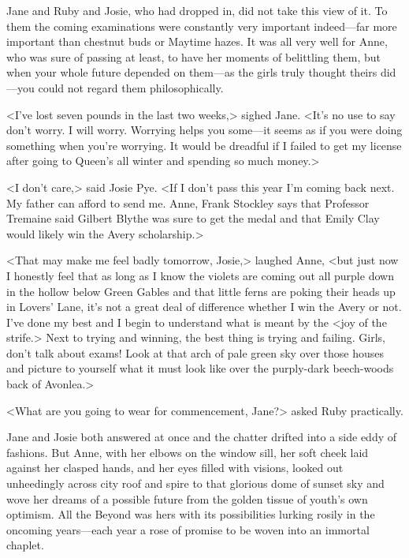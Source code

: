 Jane and Ruby and Josie, who had dropped in, did not take this view of it. To them the coming examinations were constantly very important indeed—far more important than chestnut buds or Maytime hazes. It was all very well for Anne, who was sure of passing at least, to have her moments of belittling them, but when your whole future depended on them—as the girls truly thought theirs did—you could not regard them philosophically.

<I've lost seven pounds in the last two weeks,> sighed Jane. <It's no use to say don't worry. I will worry. Worrying helps you some—it seems as if you were doing something when you're worrying. It would be dreadful if I failed to get my license after going to Queen's all winter and spending so much money.>

<I don't care,> said Josie Pye. <If I don't pass this year I'm coming back next. My father can afford to send me. Anne, Frank Stockley says that Professor Tremaine said Gilbert Blythe was sure to get the medal and that Emily Clay would likely win the Avery scholarship.>

<That may make me feel badly tomorrow, Josie,> laughed Anne, <but just now I honestly feel that as long as I know the violets are coming out all purple down in the hollow below Green Gables and that little ferns are poking their heads up in Lovers' Lane, it's not a great deal of difference whether I win the Avery or not. I've done my best and I begin to understand what is meant by the <joy of the strife.> Next to trying and winning, the best thing is trying and failing. Girls, don't talk about exams! Look at that arch of pale green sky over those houses and picture to yourself what it must look like over the purply-dark beech-woods back of Avonlea.>

<What are you going to wear for commencement, Jane?> asked Ruby practically.

Jane and Josie both answered at once and the chatter drifted into a side eddy of fashions. But Anne, with her elbows on the window sill, her soft cheek laid against her clasped hands, and her eyes filled with visions, looked out unheedingly across city roof and spire to that glorious dome of sunset sky and wove her dreams of a possible future from the golden tissue of youth's own optimism. All the Beyond was hers with its possibilities lurking rosily in the oncoming years—each year a rose of promise to be woven into an immortal chaplet.

\begin{a4}
	\enlargethispage{\baselineskip}
\end{a4}
